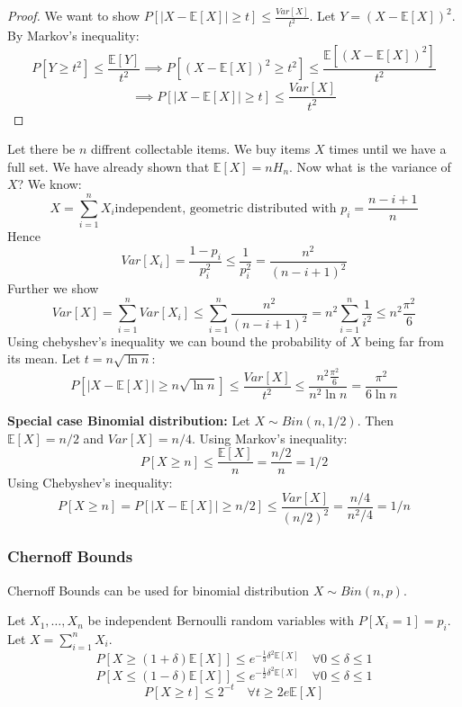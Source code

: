 \begin{proof}
	We want to show $P[|X-\mathbb{E}[X]| \geq t] \leq \frac{Var[X]}{t^2}$.
	Let $Y = (X-\mathbb{E}[X])^2$. By Markov's inequality:
	$$P[Y \geq t^2] \leq \frac{\mathbb{E}[Y]}{t^2}  \implies  P[(X-\mathbb{E}[X])^2 \geq t^2] \leq \frac{\mathbb{E}[(X-\mathbb{E}[X])^2]}{t^2}$$
	$$\implies P[|X-\mathbb{E}[X]| \geq t] \leq \frac{Var[X]}{t^2}$$
\end{proof}

\begin{example}
	Let there be $n$ diffrent collectable items. We buy items $X$ times until we have a full set. We have already shown that $\mathbb{E}[X] = n H_n$. Now what is the variance of $X$?
	We know:
	$$X = \sum_{i=1}^n X_i \text{independent, geometric distributed with } p_i = \frac{n-i+1}{n}$$
	Hence
	$$Var[X_i] = \frac{1-p_i}{p_i^2} \leq \frac{1}{p_i^2} = \frac{n^2}{(n-i+1)^2}$$
	Further we show
	$$Var[X] = \sum_{i=1}^n Var[X_i] \leq \sum_{i=1}^n \frac{n^2}{(n-i+1)^2} = n^2 \sum_{i=1}^n \frac{1}{i^2} \leq n^2 \frac{\pi^2}{6}$$
	Using chebyshev's inequality we can bound the probability of $X$ being far from its mean. Let $t = n  \sqrt{\ln n}$:
	$$P[|X-\mathbb{E}[X]| \geq n \sqrt{\ln n}] \leq \frac{Var[X]}{t^2} \leq \frac{n^2 \frac{\pi^2}{6}}{n^2 \ln n} = \frac{\pi^2}{6 \ln n}$$

\end{example}

\begin{example}
	\textbf{Special case Binomial distribution: } Let $X \sim Bin(n, 1/2)$. Then $\mathbb{E}[X] = n/2$ and $Var[X] = n/4$.
	Using Markov's inequality:
	$$P[X \geq n] \leq \frac{\mathbb{E}[X]}{n} = \frac{n/2}{n} = 1/2$$
	Using Chebyshev's inequality:
	$$P[X \geq n] = P[|X-\mathbb{E}[X]| \geq n/2] \leq \frac{Var[X]}{(n/2)^2} = \frac{n/4}{n^2/4} = 1/n$$
\end{example}

\subsubsection{Chernoff Bounds}

\begin{remark}
	Chernoff Bounds can be used for binomial distribution $X \sim Bin(n, p)$.
\end{remark}

\begin{theorem}
	Let $X_1, \dots, X_n$ be independent Bernoulli random variables with $P[X_i=1] = p_i$. Let $X = \sum_{i=1}^n X_i$.
	$$P[X \geq (1+\delta)\mathbb{E}[X]] \leq e^{-\frac{1}{3}\delta^2\mathbb{E}[X]} \quad \forall 0 \leq \delta \leq 1$$
	$$P[X \leq (1-\delta)\mathbb{E}[X]] \leq e^{-\frac{1}{2}\delta^2\mathbb{E}[X]} \quad \forall 0 \leq \delta \leq 1$$
	$$P[X \geq t] \leq 2^{-t} \quad \forall t \geq 2 e \mathbb{E}[X]$$
\end{theorem}

